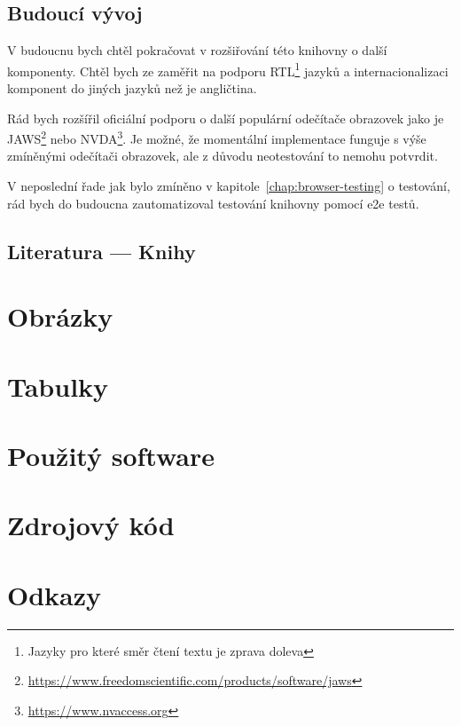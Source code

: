 \documentclass{ctuthesis}
\begin{document}
\section{Budoucí vývoj}

V budoucnu bych chtěl pokračovat v rozšiřování této knihovny o další komponenty.
Chtěl bych ze zaměřit na podporu RTL\footnote{Jazyky pro které směr čtení textu je zprava doleva} jazyků a internacionalizaci komponent do jiných jazyků než je angličtina.

Rád bych rozšířil oficiální podporu o další populární odečítače obrazovek jako je JAWS\footnote{\url{https://www.freedomscientific.com/products/software/jaws}} nebo NVDA\footnote{\url{https://www.nvaccess.org}}.
Je možné, že momentální implementace funguje s výše zmíněnými odečítači obrazovek, ale z důvodu neotestování to nemohu potvrdit.

V neposlední řade jak bylo zmíněno v kapitole~\ref{chap:browser-testing} o testování, rád bych do budoucna zautomatizoval testování knihovny pomocí \gls{e2e} testů.

\appendix

\printbibliography[title={Seznam literatury}]

\section{Literatura --- Knihy}

\printbibliography[heading=none,type=book]

\chapter{Obrázky}



\chapter{Tabulky}



\chapter{Použitý software}



\chapter{Zdrojový kód}



\chapter{Odkazy}


\end{document}
